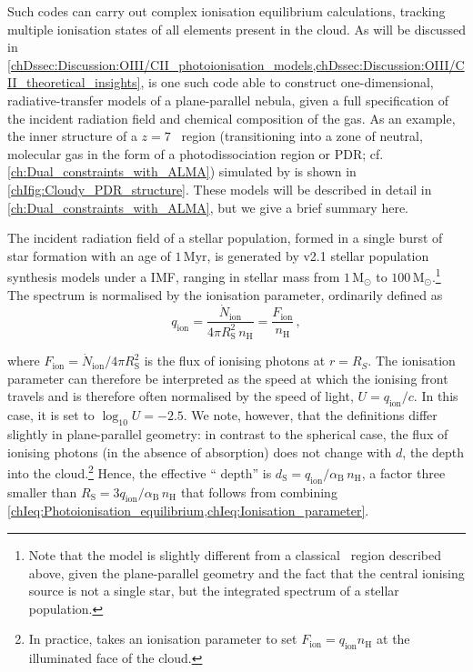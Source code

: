 Such codes can carry out complex ionisation equilibrium calculations, tracking multiple ionisation states of all elements present in the cloud. As will be discussed in \cref{chDssec:Discussion:OIII/CII_photoionisation_models,chDssec:Discussion:OIII/CII_theoretical_insights},  \citep[e.g.][]{2017RMxAA..53..385F} is one such code able to construct one-dimensional, radiative-transfer models of a plane-parallel nebula, given a full specification of the incident radiation field and chemical composition of the gas. As an example, the inner structure of a $z = 7$ \HII\ region (transitioning into a zone of neutral, molecular gas in the form of a photodissociation region or PDR; cf. \cref{ch:Dual_constraints_with_ALMA}) simulated by  is shown in \cref{chIfig:Cloudy_PDR_structure}. These models will be described in detail in \cref{ch:Dual_constraints_with_ALMA}, but we give a brief summary here.

The incident radiation field of a stellar population, formed in a single burst of star formation with an age of $1 \, \mathrm{Myr}$, is generated by  v2.1 stellar population synthesis models \citep[including binary stars;][]{2017PASA...34...58E} under a \citeauthor{1955ApJ...121..161S} IMF, ranging in stellar mass from $1 \, \mathrm{M_\odot}$ to $100 \, \mathrm{M_\odot}$.\footnote{Note that the model is slightly different from a classical \HII\ region described above, given the plane-parallel geometry and the fact that the central ionising source is not a single star, but the integrated spectrum of a stellar population.} The spectrum is normalised by the ionisation parameter, ordinarily defined as
\begin{equation}
    \label{chIeq:Ionisation_parameter}
    q_\text{ion} = \frac{\dot{N}_\text{ion}}{4 \pi R_\text{S}^2 \, n_\text{H}} = \frac{F_\text{ion}}{n_\text{H}} \, ,
\end{equation}

\noindent where $F_\text{ion} = \dot{N}_\text{ion} / 4 \pi R_\text{S}^2$ is the flux of ionising photons at $r = R_S$. The ionisation parameter can therefore be interpreted as the speed at which the ionising front travels and is therefore often normalised by the speed of light, $U = q_\text{ion} / c$. In this case, it is set to $\log_{10} U = -2.5$. We note, however, that the definitions differ slightly in plane-parallel geometry: in contrast to the spherical case, the flux of ionising photons (in the absence of absorption) does not change with $d$, the depth into the cloud.\footnote{In practice,  takes an ionisation parameter to set $F_\text{ion} = q_\text{ion} n_\text{H}$ at the illuminated face of the cloud.} Hence, the effective ``\citeauthor{1939ApJ....89..526S} depth'' is $d_\text{S} = q_\text{ion}/\alpha_\text{B} \, n_\text{H}$, a factor three smaller than $R_\text{S} = 3q_\text{ion}/\alpha_\text{B} \, n_\text{H}$ that follows from combining \cref{chIeq:Photoionisation_equilibrium,chIeq:Ionisation_parameter}.

